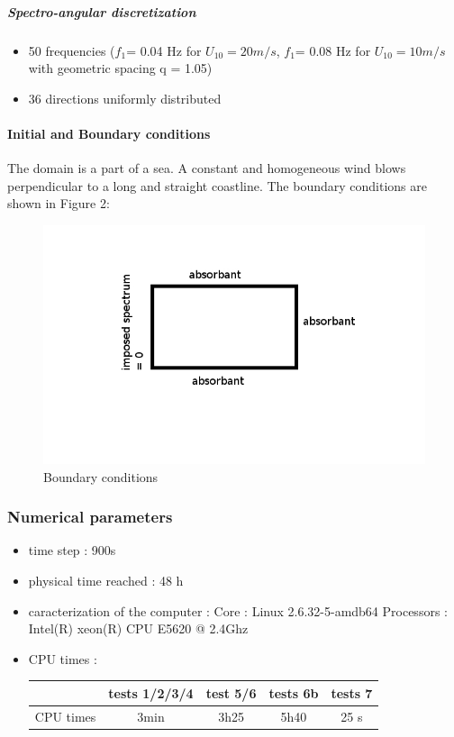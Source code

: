 \subparagraph{Spectro-angular discretization}
\begin{itemize}
\item 50 frequencies ($f_1 $= 0.04 Hz for $U_{10} = 20m/s$, $f_1 $= 0.08 Hz for $U_{10} = 10m/s$ with geometric spacing q = 1.05)
\item 36 directions uniformly distributed
\end{itemize}

\paragraph{Initial and Boundary conditions}
The domain is a part of a sea. A constant and homogeneous wind blows perpendicular to a long and straight coastline. The boundary conditions are shown in Figure 2:
\begin{figure}
\centering
\includegraphics[scale=0.5]{boundarycond.jpg}
\caption{Boundary conditions}
\end{figure}
\subsubsection{Numerical parameters}
\begin{itemize}
\item time step : 900s
\item physical time reached : 48 h
\item caracterization of the computer : \subitem Core : Linux 2.6.32-5-amdb64 \subitem Processors : Intel(R) 
xeon(R) CPU E5620 @ 2.4Ghz
\item CPU times : \\
\begin{tabular}{c|c|c|c|c}
 & tests 1/2/3/4 & test 5/6 &tests 6b & tests 7\\
 \hline
CPU times & 3min & 3h25 & 5h40 & 25 s \\
\end{tabular}
\end{itemize}


